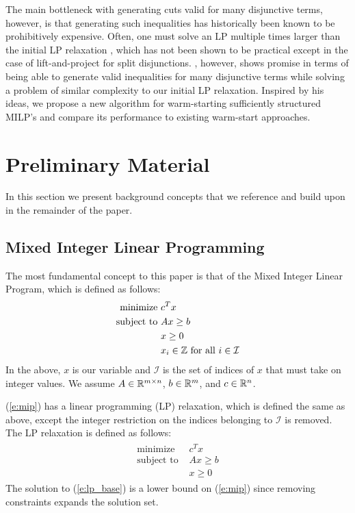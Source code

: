 \documentclass[10pt]{article}
\begin{document}
	The main bottleneck with generating cuts valid for many disjunctive terms, however, is that generating such inequalities has historically been known to be prohibitively expensive. Often, one must solve an LP multiple times larger than the initial LP relaxation \cite{liftproject}, which has not been shown to be practical except in the case of lift-and-project for split disjunctions. \cite{aleks}, however, shows promise in terms of being able to generate valid inequalities for many disjunctive terms while solving a problem of similar complexity to our initial LP relaxation. Inspired by his ideas, we propose a new algorithm for warm-starting sufficiently structured MILP's and compare its performance to existing warm-start approaches.	
	
	\section{Preliminary Material} \label{s:prelim}
	In this section we present background concepts that we reference and build upon in the remainder of the paper.
	
	\subsection{Mixed Integer Linear Programming} \label{ss:milp}
	The most fundamental concept to this paper is that of the Mixed Integer Linear Program, which is defined as follows:
	\begin{align}
		\begin{split}
			\text{minimize } & c^T x \\
			\text{subject to } & Ax \geq b \\
			& x \geq 0 \\
			& x_i \in \mathbb{Z} \text{ for all } i \in \mathcal{I}
		\end{split} \label{e:mip}
	\end{align}
	In the above, $ x $ is our variable and $ \mathcal{I} $ is the set of indices of $ x $ that must take on integer values. We assume $ A \in \mathbb{R}^{m \times n} $, $ b \in \mathbb{R}^m $, and $ c \in \mathbb{R}^n $.
	
	(\ref{e:mip}) has a linear programming (LP) relaxation, which is defined the same as above, except the integer restriction on the indices belonging to $ \mathcal{I} $ is removed. The LP relaxation is defined as follows:
	\begin{align}
		\begin{split}
			\text{minimize } & c^T x \\
			\text{subject to } & Ax \geq b \\
			& x \geq 0
		\end{split} \label{e:lp_base}
	\end{align}
	The solution to (\ref{e:lp_base}) is a lower bound on (\ref{e:mip}) since removing constraints expands the solution set.
	
\end{document}
